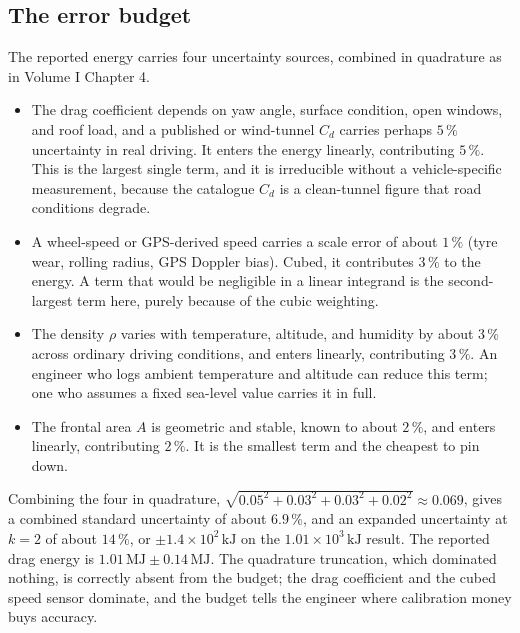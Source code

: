 \subsection{The error budget}

The reported energy carries four uncertainty sources, combined in
quadrature as in Volume I Chapter 4.

\begin{itemize}[leftmargin=*]
  \item {} The drag coefficient
    depends on yaw angle, surface condition, open windows, and roof
    load, and a published or wind-tunnel $C_{d}$ carries perhaps
    $5\,\%$ uncertainty in real driving. It enters the energy linearly,
    contributing $5\,\%$. This is the largest single term, and it is
    irreducible without a vehicle-specific measurement, because the
    catalogue $C_{d}$ is a clean-tunnel figure that road conditions
    degrade.
  \item {} A wheel-speed or
    GPS-derived speed carries a scale error of about $1\,\%$ (tyre
    wear, rolling radius, GPS Doppler bias). Cubed, it contributes
    $3\,\%$ to the energy. A term that would be negligible in a linear
    integrand is the second-largest term here, purely because of the
    cubic weighting.
  \item {} The density $\rho$ varies
    with temperature, altitude, and humidity by about $3\,\%$ across
    ordinary driving conditions, and enters linearly, contributing
    $3\,\%$. An engineer who logs ambient temperature and altitude can
    reduce this term; one who assumes a fixed sea-level value carries
    it in full.
  \item {} The frontal area $A$ is
    geometric and stable, known to about $2\,\%$, and enters linearly,
    contributing $2\,\%$. It is the smallest term and the cheapest to
    pin down.
\end{itemize}

Combining the four in quadrature, $\sqrt{0.05^{2} + 0.03^{2} + 0.03^{2}
+ 0.02^{2}} \approx 0.069$, gives a combined standard uncertainty of
about $6.9\,\%$, and an expanded uncertainty at $k = 2$ of about
$14\,\%$, or $\pm 1.4\times 10^{2}\,\si{\kilo\joule}$ on the
$1.01\times 10^{3}\,\si{\kilo\joule}$ result. The reported drag energy
is $1.01\,\si{\mega\joule} \pm 0.14\,\si{\mega\joule}$. The quadrature
truncation, which dominated nothing, is correctly absent from the
budget; the drag coefficient and the cubed speed sensor dominate, and
the budget tells the engineer where calibration money buys accuracy.


